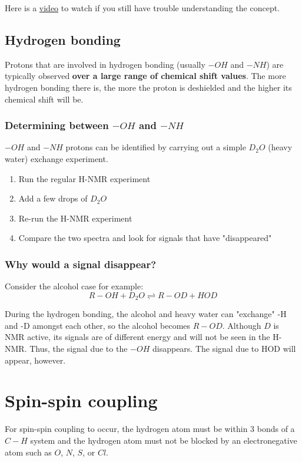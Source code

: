 \documentclass[11pt]{article}
\begin{document}
Here is a \href{https://youtu.be/w8ew5bvdrqg}{video} to watch if you still have trouble understanding the concept.

\subsection{Hydrogen bonding}
\label{sec:org17ae303}
Protons that are involved in hydrogen bonding (usually \(-OH\) and \(-NH\)) are typically observed \textbf{over a large range of chemical shift values}. The more hydrogen bonding there is, the more the proton is deshielded and the higher its chemical shift will be.

\subsubsection{Determining between \(-OH\) and \(-NH\)}
\label{sec:org51179fb}
\(-OH\) and \(-NH\) protons can be identified by carrying out a simple \(D_2O\) (heavy water) exchange experiment.
\begin{enumerate}
\item Run the regular H-NMR experiment
\item Add a few drops of \(D_2O\)
\item Re-run the H-NMR experiment
\item Compare the two spectra and look for signals that have "disappeared"
\end{enumerate}

\subsubsection{Why would a signal disappear?}
\label{sec:org931b07d}
Consider the alcohol case for example:
\[R-OH + D_2O \rightleftharpoons R-OD + HOD\]

During the hydrogen bonding, the alcohol and heavy water can "exchange" -H and -D amongst each other, so the alcohol becomes \(R-OD\). Although \(D\) is NMR active, its signals are of different energy and will not be seen in the H-NMR. Thus, the signal due to the \(-OH\) disappears. The signal due to HOD will appear, however.


\section{Spin-spin coupling}
\label{sec:org41ef559}

For spin-spin coupling to occur, the hydrogen atom must be within 3 bonds of a \(C-H\) system and the hydrogen atom must not be blocked by an electronegative atom such as \(O\), \(N\), \(S\), or \(Cl\).
\\[0pt]
\end{document}
